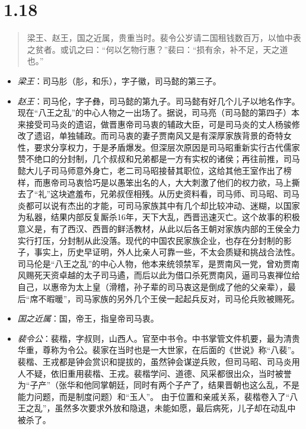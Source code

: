 \documentclass[]{book}
\providecommand{\tightlist}{%
  \setlength{\itemsep}{0pt}\setlength{\parskip}{0pt}}
\begin{document}
\section{1.18}\label{section-17}

\begin{quote}
梁王、赵王，国之近属，贵重当时。裴令公岁请二国租钱数百万，以恤中表之贫者。或讥之曰：``何以乞物行惠？''裴曰：``损有余，补不足，天之道也。''
\end{quote}

\begin{itemize}
\tightlist
\item
  \emph{梁王}：司马肜（肜，和乐），字子徽，司马懿的第三子。
\item
  \emph{赵王}：司马伦，字子彝，司马懿的第九子。司马懿有好几个儿子以地名作字。现在``八王之乱''的中心人物之一出场了。据说，司马亮（司马懿的第四子）本来接受司马炎的遗诏，做晋惠帝司马衷的辅政大臣，可是司马炎的丈人杨骏修改了遗诏，单独辅政。而司马衷的妻子贾南风又是有深厚家族背景的奇特女性，要求分享权力，于是矛盾爆发。但深层次原因是司马昭重新实行古代儒家赞不绝口的分封制，几个叔叔和兄弟都是一方有实权的诸侯；再往前推，司马懿大儿子司马师意外身亡，老二司马昭接替其职位，这给其他王室作出了榜样，而惠帝司马衷恰巧是以愚笨出名的人，大大刺激了他们的权力欲，马上撕去了``礼''这块遮羞布，兄弟叔侄相残。从历史资料看，司马师、司马昭、司马炎都可以说有杰出的才能，可司马家族其中有几个却比较冲动、迷糊，以国家为私器，结果内部反复厮杀16年，天下大乱，西晋迅速灭亡。这个故事的积极意义是，有了西汉、西晋的鲜活教材，从此以后各王朝对家族内部的王侯全力实行打压，分封制从此没落。现代的中国农民家族企业，也存在分封制的影子，事实上，历史早证明，外人比亲人可靠一些，不太会质疑和挑战合法性。司马伦是``八王之乱''的中心人物，他本来统领禁军，是贾南风一党，曾劝贾南风赐死天资卓越的太子司马遹，而后以此为借口杀死贾南风，逼司马衷禅位给自己，以惠帝为太上皇（滑稽，孙子辈的司马衷这是倒成了他的父亲辈），最后``席不暇暖''，司马家族的另外几个王侯一起起兵反对，司马伦兵败被赐死。
\item
  \emph{国之近属}：国，帝王，指皇帝司马衷。
\item
  \emph{裴令公}：裴楷，字叔则，山西人。官至中书令。中书掌管文件机要，最为清贵华重，尊称为令公。裴家在当时也是一大世家，在后面的《世说》称``八裴''。裴楷、王戎都是钟会赏识和提拔的，虽然钟会谋逆兵败，但司马昭、司马炎用人不疑，依旧重用裴楷、王戎。裴楷学问、道德、风采都很出众，当时被誉为``子产''（张华和他同掌朝廷，同时有两个子产了，结果晋朝也这么乱，不是能力问题，而是制度问题）和``玉人''。
  由于位置和亲戚关系，裴楷卷入了``八王之乱''，虽然多次要求外放和隐退，未能如愿，最后病死，儿子却在动乱中被杀了。

\end{itemize}
\end{document}
